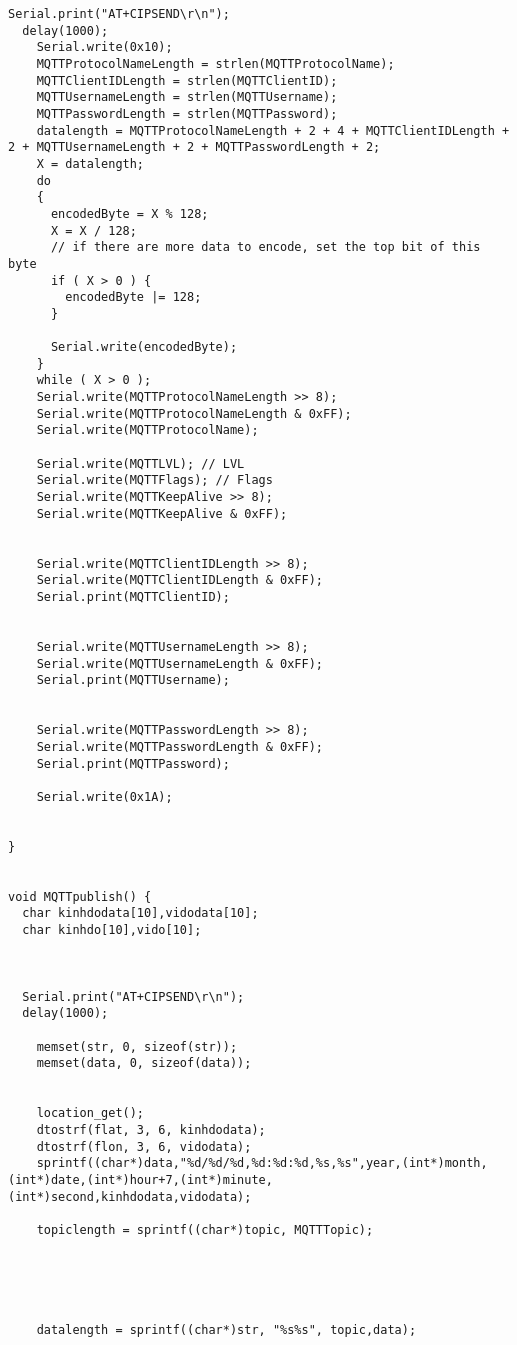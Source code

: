 \documentclass[12pt]{article} %
\begin{document}
\begin{lstlisting}[style=myArduino]
  Serial.print("AT+CIPSEND\r\n");
  delay(1000);
    Serial.write(0x10);
    MQTTProtocolNameLength = strlen(MQTTProtocolName);
    MQTTClientIDLength = strlen(MQTTClientID);
    MQTTUsernameLength = strlen(MQTTUsername);
    MQTTPasswordLength = strlen(MQTTPassword);
    datalength = MQTTProtocolNameLength + 2 + 4 + MQTTClientIDLength + 2 + MQTTUsernameLength + 2 + MQTTPasswordLength + 2;
    X = datalength;
    do
    {
      encodedByte = X % 128;
      X = X / 128;
      // if there are more data to encode, set the top bit of this byte
      if ( X > 0 ) {
        encodedByte |= 128;
      }

      Serial.write(encodedByte);
    }
    while ( X > 0 );
    Serial.write(MQTTProtocolNameLength >> 8);
    Serial.write(MQTTProtocolNameLength & 0xFF);
    Serial.write(MQTTProtocolName);

    Serial.write(MQTTLVL); // LVL
    Serial.write(MQTTFlags); // Flags
    Serial.write(MQTTKeepAlive >> 8);
    Serial.write(MQTTKeepAlive & 0xFF);


    Serial.write(MQTTClientIDLength >> 8);
    Serial.write(MQTTClientIDLength & 0xFF);
    Serial.print(MQTTClientID);


    Serial.write(MQTTUsernameLength >> 8);
    Serial.write(MQTTUsernameLength & 0xFF);
    Serial.print(MQTTUsername);


    Serial.write(MQTTPasswordLength >> 8);
    Serial.write(MQTTPasswordLength & 0xFF);
    Serial.print(MQTTPassword);

    Serial.write(0x1A);
    
    
}


void MQTTpublish() {
  char kinhdodata[10],vidodata[10];
  char kinhdo[10],vido[10];


  
  Serial.print("AT+CIPSEND\r\n");
  delay(1000);

    memset(str, 0, sizeof(str));
    memset(data, 0, sizeof(data));
    
    
    location_get();
    dtostrf(flat, 3, 6, kinhdodata);
    dtostrf(flon, 3, 6, vidodata);
    sprintf((char*)data,"%d/%d/%d,%d:%d:%d,%s,%s",year,(int*)month,(int*)date,(int*)hour+7,(int*)minute,(int*)second,kinhdodata,vidodata);
   
    topiclength = sprintf((char*)topic, MQTTTopic);

    

    

    datalength = sprintf((char*)str, "%s%s", topic,data);


\end{lstlisting}
\end{document}
